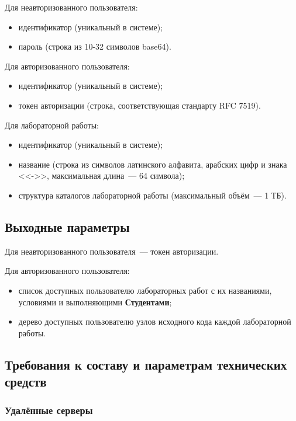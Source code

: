 \documentclass{bmstu}
\begin{document}
  Для неавторизованного пользователя:
  \begin{itemize}[label=---]
    \item идентификатор (уникальный в системе);
    \item пароль (строка из 10-32 символов base64).
  \end{itemize}

  Для авторизованного пользователя:
  \begin{itemize}[label=---]
    \item идентификатор (уникальный в системе);
    \item токен авторизации (строка, соответствующая стандарту RFC 7519).
  \end{itemize}

  Для лабораторной работы:
  \begin{itemize}[label=---]
    \item идентификатор (уникальный в системе);
    \item название (строка из символов латинского алфавита, арабских
      цифр и знака <<->>, максимальная длина~--- 64 символа);
    \item структура каталогов лабораторной работы (максимальный
      объём~--- 1 ТБ).
  \end{itemize}

  \subsection{Выходные параметры}

  Для неавторизованного пользователя~--- токен авторизации.

  Для авторизованного пользователя:
  \begin{itemize}[label=---]
    \item список доступных пользователю лабораторных работ с их
      названиями, условиями и выполняющими \textbf{Студентами};
    \item дерево доступных пользователю узлов исходного кода каждой
      лабораторной работы.
  \end{itemize}

  \subsection{Требования к составу и параметрам технических средств}
  
  \subsubsection{Удалённые серверы}
  
\end{document}
